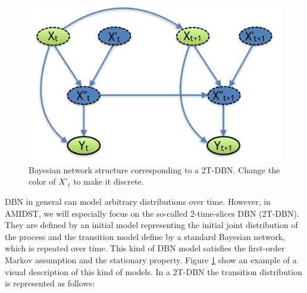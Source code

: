 %
%
%
%
\begin{figure}
\begin{center}
\includegraphics[scale=0.45]{./figures/PreliminariesDBN}
\caption{\label{Figure:DBN}Bayesian network structure corresponding to a 2T-DBN. {\color{red} Change the color of $X'_t$ to make it discrete.}}
\end{center}
\end{figure}

DBN in general can model arbitrary distributions over time. However, in AMIDST,  we will especially focus on the so-called 2-time-slices DBN (2T-DBN). They are defined by an initial model representing the initial joint distribution of the process and the transition model define by a standard Bayesian network, which is repeated over time.  This kind of DBN model satisfies the first-order Markov assumption and the stationary property. Figure \ref{Figure:DBN} show an example of a visual description of this kind of models. In a 2T-DBN the transition distribution is represented as follows:

